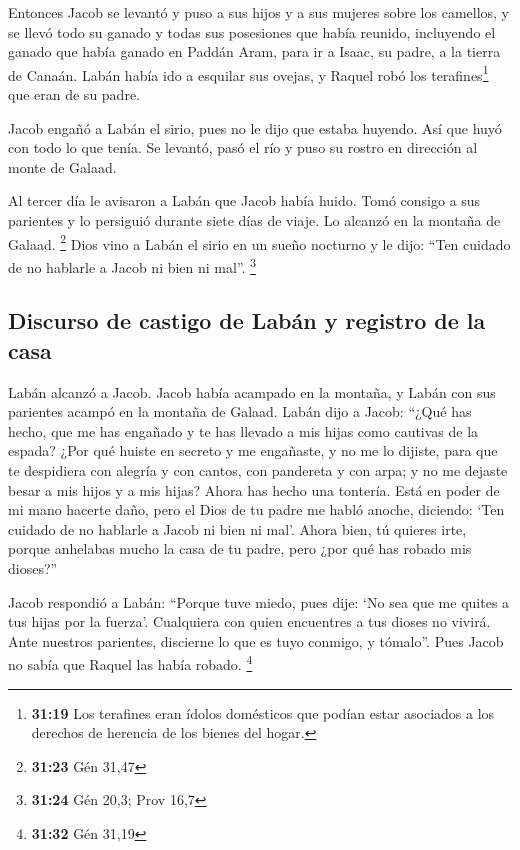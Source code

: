 \begin{paracol}{2}
 Entonces Jacob se levantó y puso a sus hijos y a sus
mujeres sobre los camellos,  y se llevó todo su ganado y
todas sus posesiones que había reunido, incluyendo el ganado que había
ganado en Paddán Aram, para ir a Isaac, su padre, a la tierra de Canaán.
 Labán había ido a esquilar sus ovejas, y Raquel robó los
terafines\footnote{\textbf{31:19} Los terafines eran ídolos domésticos
  que podían estar asociados a los derechos de herencia de los bienes
  del hogar.} que eran de su padre.

 Jacob engañó a Labán el sirio, pues no le dijo que
estaba huyendo.  Así que huyó con todo lo que tenía. Se
levantó, pasó el río y puso su rostro en dirección al monte de Galaad.

 Al tercer día le avisaron a Labán que Jacob había huido.
 Tomó consigo a sus parientes y lo persiguió durante
siete días de viaje. Lo alcanzó en la montaña de Galaad. \footnote{\textbf{31:23}
  Gén 31,47}  Dios vino a Labán el sirio en un sueño
nocturno y le dijo: ``Ten cuidado de no hablarle a Jacob ni bien ni
mal''. \footnote{\textbf{31:24} Gén 20,3; Prov 16,7}

\hypertarget{discurso-de-castigo-de-labuxe1n-y-registro-de-la-casa}{%
\subsection{Discurso de castigo de Labán y registro de la
casa}\label{discurso-de-castigo-de-labuxe1n-y-registro-de-la-casa}}

 Labán alcanzó a Jacob. Jacob había acampado en la
montaña, y Labán con sus parientes acampó en la montaña de Galaad.
 Labán dijo a Jacob: ``¿Qué has hecho, que me has
engañado y te has llevado a mis hijas como cautivas de la espada?
 ¿Por qué huiste en secreto y me engañaste, y no me lo
dijiste, para que te despidiera con alegría y con cantos, con pandereta
y con arpa;  y no me dejaste besar a mis hijos y a mis
hijas? Ahora has hecho una tontería.  Está en poder de mi
mano hacerte daño, pero el Dios de tu padre me habló anoche, diciendo:
`Ten cuidado de no hablarle a Jacob ni bien ni mal'. 
Ahora bien, tú quieres irte, porque anhelabas mucho la casa de tu padre,
pero ¿por qué has robado mis dioses?''

 Jacob respondió a Labán: ``Porque tuve miedo, pues dije:
`No sea que me quites a tus hijas por la fuerza'. 
Cualquiera con quien encuentres a tus dioses no vivirá. Ante nuestros
parientes, discierne lo que es tuyo conmigo, y tómalo''. Pues Jacob no
sabía que Raquel las había robado. \footnote{\textbf{31:32} Gén 31,19}


\end{paracol}
